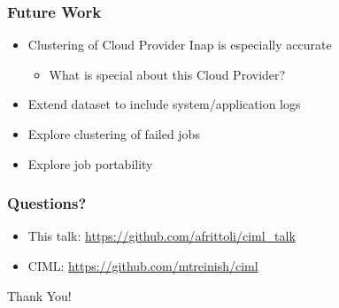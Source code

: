 \documentclass[aspectratio=169,11pt,hyperref={colorlinks=true}]{beamer}
\begin{document}
\begin{frame}
  \frametitle{Future Work}
  \begin{itemize}
    \item{Clustering of Cloud Provider Inap is especially accurate}
    \begin{itemize}
      \item[] What is special about this Cloud Provider?
    \end{itemize}
    \item{Extend dataset to include system/application logs}
    \item{Explore clustering of failed jobs}
    \item{Explore job portability}
  \end{itemize}
\end{frame}

\begin{frame}
  \frametitle{Questions?}
  \begin{itemize}
      \item{This talk: \href{https://github.com/afrittoli/ciml\_talk}{https://github.com/afrittoli/ciml\_talk}}
      \item{CIML: \href{https://github.com/mtreinish/ciml}{https://github.com/mtreinish/ciml}}
  \end{itemize}
\end{frame}

\begin{centraldark}{Thank You!}\end{centraldark}
\end{document}
